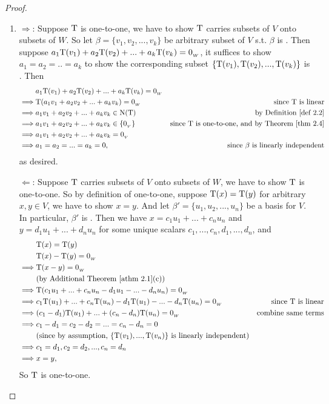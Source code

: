 \begin{proof} \ 
\begin{enumerate}
\item
\(\Longrightarrow\): Suppose \(\mathrm{T}\) is one-to-one, we have to show \(\mathrm{T}\) carries \LID{} subsets of \(V\) onto \LID{} subsets of \(W\).
So let \(\beta = \{ v_1, v_2, ..., v_k \}\) be arbitrary subset of \(V\) s.t. \(\beta\) is \LID{}.
Then suppose \(a_1\mathrm{T}(v_1) + a_2\mathrm{T}(v_2) + ... + a_k\mathrm{T}(v_k) = 0_{_W}\), it suffices to show \(a_1 = a_2 = .. = a_k\) to show the corresponding subset \(\{ \mathrm{T}(v_1), \mathrm{T}(v_2), ..., \mathrm{T}(v_k) \}\) is \LID{}.
Then
\begin{align*}
             & a_1\T(v_1) + a_2\T(v_2) + ... + a_k\T(v_k) = \OW \\
    \implies & \T(a_1 v_1 + a_2 v_2 + ... + a_k v_k) = \OW & \text{since \(\T\) is linear} \\
    \implies & a_1 v_1 + a_2 v_2 + ... + a_k v_k \in \NULLT & \text{by \DEF{2.2}} \\
    \implies & a_1 v_1 + a_2 v_2 + ... + a_k v_k \in \{ \OV \} & \text{since \(\T\) is one-to-one, and by \THM{2.4}} \\
    \implies & a_1 v_1 + a_2 v_2 + ... + a_k v_k = \OV \\
    \implies & a_1 = a_2 = ... = a_k = 0, & \text{since \(\beta\) is \LID{}}
\end{align*}
as desired.

\(\Longleftarrow\): Suppose \(\mathrm{T}\) carries \LID{} subsets of \(V\) onto \LID{} subsets of \(W\), we have to show \(\mathrm{T}\) is one-to-one.
So by definition of one-to-one, suppose \(\mathrm{T}(x) = \mathrm{T}(y)\) for arbitrary \(x, y \in V\), we have to show \(x = y\).
And let \(\beta' = \{ u_1, u_2, ..., u_n \}\) be a basis for \(V\).
In particular, \(\beta'\) is \LID{}.
Then we have \(x = c_1 u_1 + ... + c_n u_n\) and \(y = d_1 u_1 + ... + d_n u_n\) for some unique scalars \(c_1, ..., c_n, d_1, ..., d_n\), and
\begin{align*}
             & \T(x) = \T(y) \\
             & \T(x) - \T(y) = \OW \\
    \implies & \T(x - y) = \OW \\
             & \text{(by \ATHM{2.1}(c))} \\
    \implies & \T(c_1 u_1 + ... + c_n u_n - d_1 u_1 - ... - d_n u_n) = \OW \\
    \implies & c_1\T(u_1) + ... + c_n\T(u_n) - d_1\T(u_1) - ... - d_n\T(u_n) = \OW & \text{since \(\T\) is linear} \\
    \implies & (c_1 - d_1)\T(u_1) + ... + (c_n - d_n)\T(u_n) = \OW & \text{combine same terms} \\
    \implies & c_1 - d_1 = c_2 - d_2 = ... = c_n - d_n = 0 & \\
             & \text{(since by assumption, \(\{ \T(v_1), ..., \T(v_n) \}\) is \LID{})} \\
    \implies & c_1 = d_1, c_2 = d_2, ..., c_n = d_n \\
    \implies & x = y,
\end{align*}
So \(\mathrm{T}\) is one-to-one.


\end{enumerate}
\end{proof}
